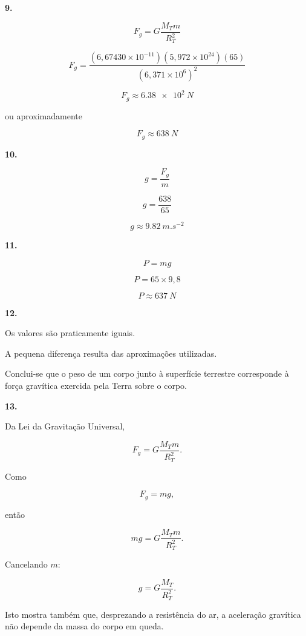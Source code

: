 \documentclass[11pt,a4paper]{article}
\begin{document}
	\begin{solucaobox}[Questões 9--13]
		
		\textbf{9.}
		
		\[
		F_g=
		G\frac{M_Tm}{R_T^2}
		\]
		
		\[
		F_g=
		\frac{
			(6{,}67430\times10^{-11})
			(5{,}972\times10^{24})
			(65)
		}{
			(6{,}371\times10^6)^2
		}
		\]
		
		\[
		\boxed{
			F_g\approx\SI{6.38e2}{N}
		}
		\]
		
		ou aproximadamente
		
		\[
		\boxed{
			F_g\approx\SI{638}{N}
		}
		\]
		
		\vspace{3mm}
		
		\textbf{10.}
		
		\[
		g=\frac{F_g}{m}
		\]
		
		\[
		g=
		\frac{638}{65}
		\]
		
		\[
		\boxed{
			g\approx\SI{9.82}{m.s^{-2}}
		}
		\]
		
		\vspace{3mm}
		
		\textbf{11.}
		
		\[
		P=mg
		\]
		
		\[
		P=65\times9{,}8
		\]
		
		\[
		\boxed{
			P\approx\SI{637}{N}
		}
		\]
		
		\vspace{3mm}
		
		\textbf{12.}
		
		Os valores são praticamente iguais.
		
		A pequena diferença resulta das aproximações utilizadas.
		
		Conclui-se que o peso de um corpo junto à superfície terrestre corresponde
		à força gravítica exercida pela Terra sobre o corpo.
		
		\vspace{3mm}
		
		\textbf{13.}
		
		Da Lei da Gravitação Universal,
		
		\[
		F_g=
		G\frac{M_Tm}{R_T^2}.
		\]
		
		Como
		
		\[
		F_g=mg,
		\]
		
		então
		
		\[
		mg=
		G\frac{M_Tm}{R_T^2}.
		\]
		
		Cancelando $m$:
		
		\[
		\boxed{
			g=
			G\frac{M_T}{R_T^2}
		}.
		\]
		
		Isto mostra também que, desprezando a resistência do ar, a aceleração
		gravítica não depende da massa do corpo em queda.
		
	\end{solucaobox}
	
\end{document}
